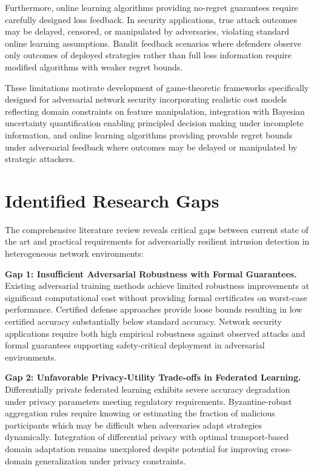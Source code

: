 Furthermore, online learning algorithms providing no-regret guarantees require carefully designed loss feedback. In security applications, true attack outcomes may be delayed, censored, or manipulated by adversaries, violating standard online learning assumptions. Bandit feedback scenarios where defenders observe only outcomes of deployed strategies rather than full loss information require modified algorithms with weaker regret bounds.

These limitations motivate development of game-theoretic frameworks specifically designed for adversarial network security incorporating realistic cost models reflecting domain constraints on feature manipulation, integration with Bayesian uncertainty quantification enabling principled decision making under incomplete information, and online learning algorithms providing provable regret bounds under adversarial feedback where outcomes may be delayed or manipulated by strategic attackers.

\section{Identified Research Gaps}
\label{sec:lit_gaps}

The comprehensive literature review reveals critical gaps between current state of the art and practical requirements for adversarially resilient intrusion detection in heterogeneous network environments:

\textbf{Gap 1: Insufficient Adversarial Robustness with Formal Guarantees.} Existing adversarial training methods achieve limited robustness improvements at significant computational cost without providing formal certificates on worst-case performance. Certified defense approaches provide loose bounds resulting in low certified accuracy substantially below standard accuracy. Network security applications require both high empirical robustness against observed attacks and formal guarantees supporting safety-critical deployment in adversarial environments.

\textbf{Gap 2: Unfavorable Privacy-Utility Trade-offs in Federated Learning.} Differentially private federated learning exhibits severe accuracy degradation under privacy parameters meeting regulatory requirements. Byzantine-robust aggregation rules require knowing or estimating the fraction of malicious participants which may be difficult when adversaries adapt strategies dynamically. Integration of differential privacy with optimal transport-based domain adaptation remains unexplored despite potential for improving cross-domain generalization under privacy constraints.

